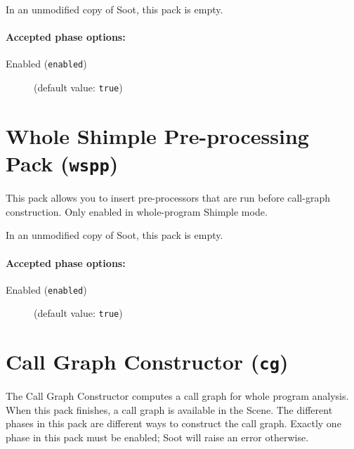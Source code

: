 \documentclass{article}
\begin{document}
In an unmodified copy of Soot, this pack is empty.
        

\paragraph{Accepted phase options:} 

\begin{description}

\item[Enabled ({\tt enabled})]
(default value: {\tt true})






\end{description}

\section{Whole Shimple Pre-processing Pack ({\tt wspp})}


\par

This pack allows you to insert pre-processors that are run before
call-graph construction. Only enabled in whole-program Shimple mode.

\par

In an unmodified copy of Soot, this pack is empty.
        

\paragraph{Accepted phase options:} 

\begin{description}

\item[Enabled ({\tt enabled})]
(default value: {\tt true})






\end{description}

\section{Call Graph Constructor ({\tt cg})}

The Call Graph Constructor computes a call graph for whole
program analysis. When this pack finishes, a call graph is
available in the Scene.  The different phases in this pack are
different ways to construct the call graph. Exactly one phase in
this pack must be enabled; Soot will raise an error otherwise.
\end{document}
